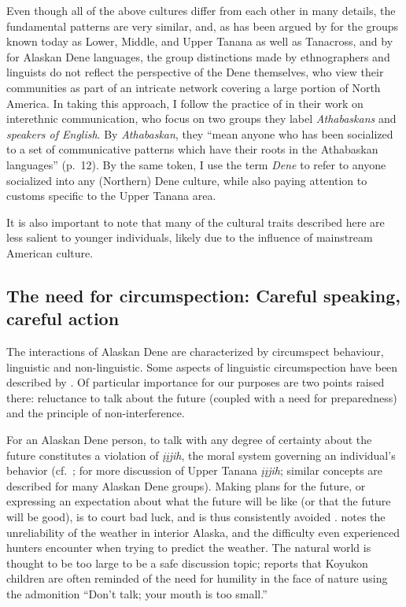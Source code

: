 \documentclass[output=paper,colorlinks,citecolor=brown
]{langscibook}
\begin{document}
Even though all of the above cultures differ from each other in many details, the fundamental patterns are very similar, and, as has been argued by \citet{McKennanR1981} for the groups known today as Lower, Middle, and Upper Tanana as well as Tanacross, and by \citet{KraussM2000Koydialects} for Alaskan Dene languages, the group distinctions made by ethnographers and linguists do not reflect the perspective of the Dene themselves, who view their communities as part of an intricate network covering a large portion of North America. In taking this approach, I follow the practice of \citet{ScollonRScollonS1981} in their work on interethnic communication, who focus on two groups they label \textit{Athabaskans} and \textit{speakers of English}. By \textit{Athabaskan}, they ``mean anyone who has been socialized to a set of communicative patterns which have their roots in the Athabaskan languages'' (p.\ 12).  By the same token, I use the term \textit{Dene} to refer to anyone socialized into any (Northern) Dene culture, while also paying attention to customs specific to the Upper Tanana area. 

It is also important to note that many of the cultural traits described here are less salient to younger individuals, likely due to the influence of mainstream American culture.

\subsection{The need for circumspection: Careful speaking, careful action}
\label{subsection:careful-action}

The interactions of Alaskan Dene are characterized by circumspect behaviour, linguistic and non-linguistic. Some aspects of linguistic circumspection have been described by \citet{ScollonRScollonS1981}. Of particular importance for our purposes are two points raised there: reluctance to talk about the future (coupled with a need for preparedness) and the principle of non-interference.

For an Alaskan Dene person, to talk with any degree of certainty about the future constitutes a violation of \textit{įįjih}, the moral system governing an individual's behavior (cf.\  \citealt[chap.\ 3]{GuedonMF2005}; \citealt{LovickO2016, LovickOTuttleS2019} for more discussion of Upper Tanana \textit{įįjih}; similar concepts are described for many Alaskan Dene groups). Making plans for the future, or expressing an expectation about what the future will be like (or that the future will be good), is to court bad luck, and is thus consistently avoided \citep[20]{ScollonRScollonS1981}.  \citet[194--195]{NelsonR1973} notes the unreliability of the weather in interior Alaska, and the difficulty even experienced hunters encounter when trying to predict the weather. The natural world is thought to be too large to be a safe discussion topic; \citet[45]{NelsonR1983} reports that Koyukon children are often reminded of the need for humility in the face of nature using the admonition ``Don't talk; your mouth is too small.''
\end{document}
